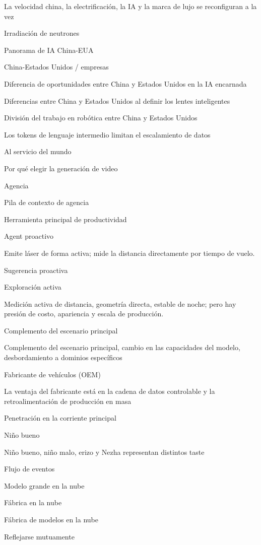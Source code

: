 \documentclass{article}
\begin{document}
La velocidad china, la electrificación, la IA y la marca de lujo se reconfiguran a la vez

Irradiación de neutrones

Panorama de IA China-EUA

China-Estados Unidos / empresas

Diferencia de oportunidades entre China y Estados Unidos en la IA encarnada

Diferencias entre China y Estados Unidos al definir los lentes inteligentes

División del trabajo en robótica entre China y Estados Unidos

Los tokens de lenguaje intermedio limitan el escalamiento de datos

Al servicio del mundo

Por qué elegir la generación de video

Agencia

Pila de contexto de agencia

Herramienta principal de productividad

Agent proactivo

Emite láser de forma activa; mide la distancia directamente por tiempo de vuelo.

Sugerencia proactiva

Exploración activa

Medición activa de distancia, geometría directa, estable de noche; pero hay presión de costo, apariencia y escala de producción.

Complemento del escenario principal

Complemento del escenario principal, cambio en las capacidades del modelo, desbordamiento a dominios específicos

Fabricante de vehículos (OEM)

La ventaja del fabricante está en la cadena de datos controlable y la retroalimentación de producción en masa

Penetración en la corriente principal

Niño bueno

Niño bueno, niño malo, erizo y Nezha representan distintos taste

Flujo de eventos

Modelo grande en la nube

Fábrica en la nube

Fábrica de modelos en la nube

Reflejarse mutuamente
\end{document}
